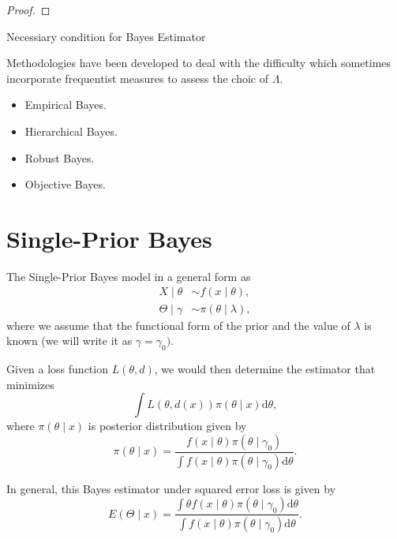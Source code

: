 \begin{proof}

\end{proof}

\begin{theorem}
    Necessiary condition for Bayes Estimator
\end{theorem}

Methodologies have been developed to deal with the difficulty which sometimes incorporate frequentist measures to assess the choic of $\Lambda$.

\begin{itemize}
    \item Empirical Bayes.
    \item Hierarchical Bayes.
    \item Robust Bayes.
    \item Objective Bayes.
\end{itemize}

\section{Single-Prior Bayes}

The Single-Prior Bayes model in a general form as
\begin{equation}
    \begin{aligned}
        X\mid\theta      & \sim f\left(x\mid\theta\right),         \\
        \Theta\mid\gamma & \sim \pi\left(\theta\mid\lambda\right),
    \end{aligned}
    \label{eq:single-prior-bayes}
\end{equation}
where we assume that the functional form of the prior and the value of $\lambda$ is known (we will write it as $\gamma=\gamma_0)$.

Given a loss function $L\left(\theta,d\right)$, we would then determine the estimator that minimizes
\begin{equation}
    \int L\left(\theta,d\left(x\right)\right)\pi\left(\theta\mid x\right)\mathrm{d}\theta,
\end{equation}
where $\pi\left(\theta\mid x\right)$ is posterior distribution given by
\begin{equation*}
    \pi\left(\theta\mid x\right)=\frac{f\left(x\mid\theta\right)\pi\left(\theta\mid\gamma_0\right)}{\int f\left(x\mid\theta\right)\pi\left(\theta\mid\gamma_0\right)\mathrm{d}\theta}.
\end{equation*}

In general, this Bayes estimator under squared error loss is given by
\begin{equation}
    E\left(\Theta\mid x\right) = \frac{\int\theta f\left(x\mid\theta\right)\pi\left(\theta\mid\gamma_0\right)\mathrm{d}\theta}{\int f\left(x\mid\theta\right)\pi\left(\theta\mid\gamma_0\right)\mathrm{d}\theta}.
\end{equation}

